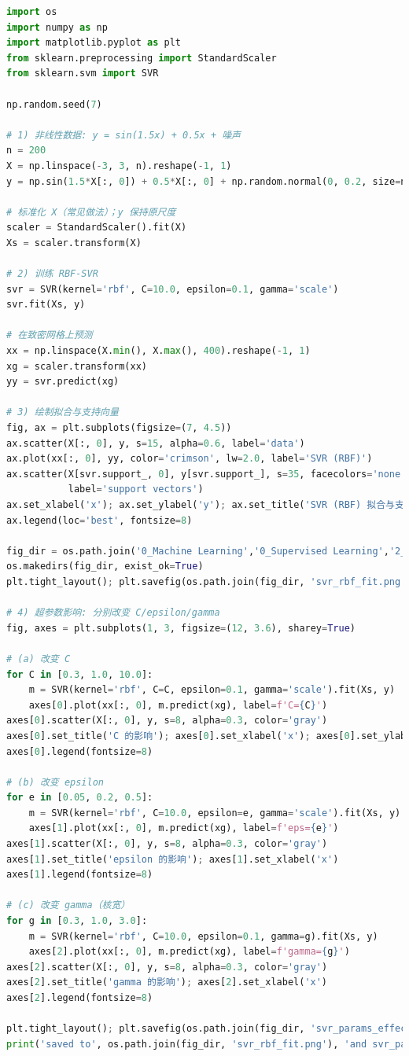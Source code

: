 \documentclass[UTF8,zihao=-4]{ctexart}
\begin{document}
\begin{lstlisting}[language=Python,caption={gen_svr_figures.py}]
import os
import numpy as np
import matplotlib.pyplot as plt
from sklearn.preprocessing import StandardScaler
from sklearn.svm import SVR

np.random.seed(7)

# 1) 非线性数据: y = sin(1.5x) + 0.5x + 噪声
n = 200
X = np.linspace(-3, 3, n).reshape(-1, 1)
y = np.sin(1.5*X[:, 0]) + 0.5*X[:, 0] + np.random.normal(0, 0.2, size=n)

# 标准化 X（常见做法）；y 保持原尺度
scaler = StandardScaler().fit(X)
Xs = scaler.transform(X)

# 2) 训练 RBF-SVR
svr = SVR(kernel='rbf', C=10.0, epsilon=0.1, gamma='scale')
svr.fit(Xs, y)

# 在致密网格上预测
xx = np.linspace(X.min(), X.max(), 400).reshape(-1, 1)
xg = scaler.transform(xx)
yy = svr.predict(xg)

# 3) 绘制拟合与支持向量
fig, ax = plt.subplots(figsize=(7, 4.5))
ax.scatter(X[:, 0], y, s=15, alpha=0.6, label='data')
ax.plot(xx[:, 0], yy, color='crimson', lw=2.0, label='SVR (RBF)')
ax.scatter(X[svr.support_, 0], y[svr.support_], s=35, facecolors='none', edgecolors='k',
           label='support vectors')
ax.set_xlabel('x'); ax.set_ylabel('y'); ax.set_title('SVR (RBF) 拟合与支持向量')
ax.legend(loc='best', fontsize=8)

fig_dir = os.path.join('0_Machine Learning','0_Supervised Learning','2_SVR','figures')
os.makedirs(fig_dir, exist_ok=True)
plt.tight_layout(); plt.savefig(os.path.join(fig_dir, 'svr_rbf_fit.png'), dpi=160)

# 4) 超参数影响: 分别改变 C/epsilon/gamma
fig, axes = plt.subplots(1, 3, figsize=(12, 3.6), sharey=True)

# (a) 改变 C
for C in [0.3, 1.0, 10.0]:
    m = SVR(kernel='rbf', C=C, epsilon=0.1, gamma='scale').fit(Xs, y)
    axes[0].plot(xx[:, 0], m.predict(xg), label=f'C={C}')
axes[0].scatter(X[:, 0], y, s=8, alpha=0.3, color='gray')
axes[0].set_title('C 的影响'); axes[0].set_xlabel('x'); axes[0].set_ylabel('y')
axes[0].legend(fontsize=8)

# (b) 改变 epsilon
for e in [0.05, 0.2, 0.5]:
    m = SVR(kernel='rbf', C=10.0, epsilon=e, gamma='scale').fit(Xs, y)
    axes[1].plot(xx[:, 0], m.predict(xg), label=f'eps={e}')
axes[1].scatter(X[:, 0], y, s=8, alpha=0.3, color='gray')
axes[1].set_title('epsilon 的影响'); axes[1].set_xlabel('x')
axes[1].legend(fontsize=8)

# (c) 改变 gamma（核宽）
for g in [0.3, 1.0, 3.0]:
    m = SVR(kernel='rbf', C=10.0, epsilon=0.1, gamma=g).fit(Xs, y)
    axes[2].plot(xx[:, 0], m.predict(xg), label=f'gamma={g}')
axes[2].scatter(X[:, 0], y, s=8, alpha=0.3, color='gray')
axes[2].set_title('gamma 的影响'); axes[2].set_xlabel('x')
axes[2].legend(fontsize=8)

plt.tight_layout(); plt.savefig(os.path.join(fig_dir, 'svr_params_effect.png'), dpi=160)
print('saved to', os.path.join(fig_dir, 'svr_rbf_fit.png'), 'and svr_params_effect.png')
\end{lstlisting}
\end{document}
